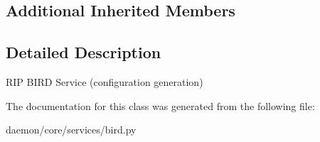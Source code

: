\subsection*{Additional Inherited Members}


\subsection{Detailed Description}
\begin{DoxyVerb}RIP BIRD Service (configuration generation)\end{DoxyVerb}
 

The documentation for this class was generated from the following file\+:\begin{DoxyCompactItemize}
\item 
daemon/core/services/bird.\+py\end{DoxyCompactItemize}
